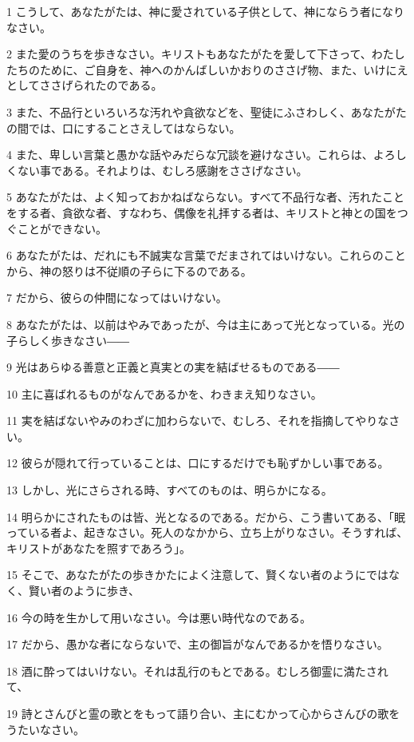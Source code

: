 \par 1 こうして、あなたがたは、神に愛されている子供として、神にならう者になりなさい。
\par 2 また愛のうちを歩きなさい。キリストもあなたがたを愛して下さって、わたしたちのために、ご自身を、神へのかんばしいかおりのささげ物、また、いけにえとしてささげられたのである。
\par 3 また、不品行といろいろな汚れや貪欲などを、聖徒にふさわしく、あなたがたの間では、口にすることさえしてはならない。
\par 4 また、卑しい言葉と愚かな話やみだらな冗談を避けなさい。これらは、よろしくない事である。それよりは、むしろ感謝をささげなさい。
\par 5 あなたがたは、よく知っておかねばならない。すべて不品行な者、汚れたことをする者、貪欲な者、すなわち、偶像を礼拝する者は、キリストと神との国をつぐことができない。
\par 6 あなたがたは、だれにも不誠実な言葉でだまされてはいけない。これらのことから、神の怒りは不従順の子らに下るのである。
\par 7 だから、彼らの仲間になってはいけない。
\par 8 あなたがたは、以前はやみであったが、今は主にあって光となっている。光の子らしく歩きなさい――
\par 9 光はあらゆる善意と正義と真実との実を結ばせるものである――
\par 10 主に喜ばれるものがなんであるかを、わきまえ知りなさい。
\par 11 実を結ばないやみのわざに加わらないで、むしろ、それを指摘してやりなさい。
\par 12 彼らが隠れて行っていることは、口にするだけでも恥ずかしい事である。
\par 13 しかし、光にさらされる時、すべてのものは、明らかになる。
\par 14 明らかにされたものは皆、光となるのである。だから、こう書いてある、「眠っている者よ、起きなさい。死人のなかから、立ち上がりなさい。そうすれば、キリストがあなたを照すであろう」。
\par 15 そこで、あなたがたの歩きかたによく注意して、賢くない者のようにではなく、賢い者のように歩き、
\par 16 今の時を生かして用いなさい。今は悪い時代なのである。
\par 17 だから、愚かな者にならないで、主の御旨がなんであるかを悟りなさい。
\par 18 酒に酔ってはいけない。それは乱行のもとである。むしろ御霊に満たされて、
\par 19 詩とさんびと霊の歌とをもって語り合い、主にむかって心からさんびの歌をうたいなさい。
